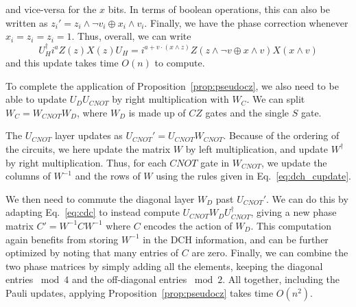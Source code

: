 and vice-versa for the $x$ bits. In terms of boolean operations, this can also be written as $z_{i}'= z_{i}\wedge\neg v_{i} \oplus x_{i}\wedge v_{i}$. Finally, we have the phase correction whenever $x_{i}=z_{i}=z_{i}=1$. Thus, overall, we can write
\begin{equation}
U_{H}^{\dagger}i^{a}Z(z)X(z)U_{H} = i^{a+v\cdot\left(x\wedge z\right)}Z(z\wedge\neg v \oplus x\wedge v)X(x\wedge v)
\label{eq:dch_hupdate}
\end{equation}
and this update takes time $O(n)$ to compute.\par
To complete the application of Proposition~\ref{prop:pseudocz}, we also need to be able to update $U_{D}U_{CNOT}$ by right multiplication with $W_{C}$. We can split $W_{C}=W_{CNOT}W_{D}$, where $W_{D}$ is made up of $CZ$ gates and the single $S$ gate.\par
The $U_{CNOT}$ layer updates as $U_{CNOT}'=U_{CNOT}W_{CNOT}$. Because of the ordering of the circuits, we here update the matrix $W$ by left multiplication, and update $W^{\dagger}$ by right multiplication. Thus, for each $CNOT$ gate in $W_{CNOT}$, we update the columns of $W^{-1}$ and the rows of $W$ using the rules given in Eq.~\ref{eq:dch_cupdate}.\par
We then need to commute the diagonal layer $W_{D}$ past $U_{CNOT}'$. We can do this by adapting Eq.~\ref{eq:cdc} to instead compute $U_{CNOT}W_{D}U_{CNOT}^{\dagger}$, giving a new phase matrix $C'=W^{-1}CW^{-1}$ where $C$ encodes the action of $W_{D}$. This computation again benefits from storing $W^{-1}$ in the DCH information, and can be further optimized by noting that many entries of $C$ are zero. Finally, we can combine the two phase matrices by simply adding all the elements, keeping the diagonal entries $\bmod 4$ and the off-diagonal entries $\bmod 2$. All together, including the Pauli updates, applying Proposition~\ref{prop:pseudocz} takes time $O(n^2)$.
